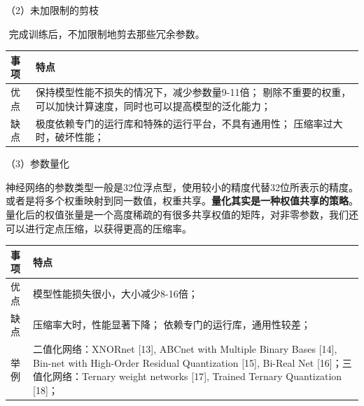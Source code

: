 （2）未加限制的剪枝

​ 完成训练后，不加限制地剪去那些冗余参数。

\begin{longtable}[]{ ll }
\toprule
事项 & 特点\tabularnewline
\midrule
\endhead
优点 & 保持模型性能不损失的情况下，减少参数量9-11倍；
剔除不重要的权重，可以加快计算速度，同时也可以提高模型的泛化能力；\tabularnewline
缺点 & 极度依赖专门的运行库和特殊的运行平台，不具有通用性；
压缩率过大时，破坏性能；\tabularnewline
\bottomrule
\end{longtable}

（3）参数量化

​
神经网络的参数类型一般是32位浮点型，使用较小的精度代替32位所表示的精度。或者是将多个权重映射到同一数值，权重共享。\textbf{量化其实是一种权值共享的策略}。量化后的权值张量是一个高度稀疏的有很多共享权值的矩阵，对非零参数，我们还可以进行定点压缩，以获得更高的压缩率。

\begin{longtable}[]{ ll }
\toprule
\begin{minipage}[b]{0.07\columnwidth}\raggedright\strut
事项\strut
\end{minipage} & \begin{minipage}[b]{0.80\columnwidth}\raggedright\strut
特点\strut
\end{minipage}\tabularnewline
\midrule
\endhead
\begin{minipage}[t]{0.07\columnwidth}\raggedright\strut
优点\strut
\end{minipage} & \begin{minipage}[t]{0.80\columnwidth}\raggedright\strut
模型性能损失很小，大小减少8-16倍；\strut
\end{minipage}\tabularnewline
\begin{minipage}[t]{0.07\columnwidth}\raggedright\strut
缺点\strut
\end{minipage} & \begin{minipage}[t]{0.80\columnwidth}\raggedright\strut
压缩率大时，性能显著下降； 依赖专门的运行库，通用性较差；\strut
\end{minipage}\tabularnewline
\begin{minipage}[t]{0.07\columnwidth}\raggedright\strut
举例\strut
\end{minipage} & \begin{minipage}[t]{0.80\columnwidth}\raggedright\strut
二值化网络：XNORnet {[}13{]}, ABCnet with Multiple Binary Bases
{[}14{]}, Bin-net with High-Order Residual Quantization {[}15{]},
Bi-Real Net {[}16{]}；三值化网络：Ternary weight networks {[}17{]},
Trained Ternary Quantization {[}18{]}；\strut
\end{minipage}\tabularnewline
\bottomrule
\end{longtable}

